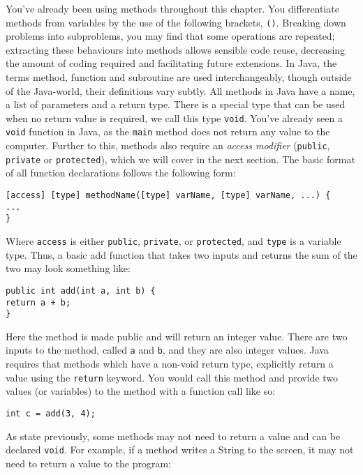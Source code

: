 You've already been using methods throughout this chapter. You differentiate methods from variables by the use of the following brackets, {\tt ()}. Breaking down problems into subproblems, you may find that some operations are repeated; extracting these behaviours into methods allows sensible code reuse, decreasing the amount of coding required and facilitating future extensions. In Java, the terms method, function and subroutine are used interchangeably, though outside of the Java-world, their definitions vary subtly. All methods in Java have a name, a list of parameters and a return type. There is a special type that can be used when no return value is required, we call this type {\tt void}. You've already seen a {\tt void} function in Java, as the {\tt main} method does not return any value to the computer. Further to this, methods also require an \emph{access modifier} ({\tt public}, {\tt private} or {\tt protected}), which we will cover in the next section. The basic format of all function declarations follows the following form:

\begin{verbatim}
[access] [type] methodName([type] varName, [type] varName, ...) {
...
}
\end{verbatim}

\noindent
Where {\tt access} is either {\tt public}, {\tt private}, or {\tt protected}, and {\tt type} is a variable type. Thus, a basic add function that takes two inputs and returns the sum of the two may look something like:

\begin{verbatim}
public int add(int a, int b) {
return a + b;
}
\end{verbatim}


\noindent
Here the method is made public and will return an integer value. There are two inputs to the method, called {\tt a} and {\tt b}, and they are also integer values. Java requires that methods which have a non-void return type, explicitly return a value using the {\tt return} keyword. You would call this method and provide two values (or variables) to the method with a function call like so:

\begin{verbatim}
int c = add(3, 4);
\end{verbatim}

\noindent
As state previously, some methods may not need to return a value and can be declared {\tt void}. For example, if a method writes a String to the screen, it may not need to return a value to the program:

